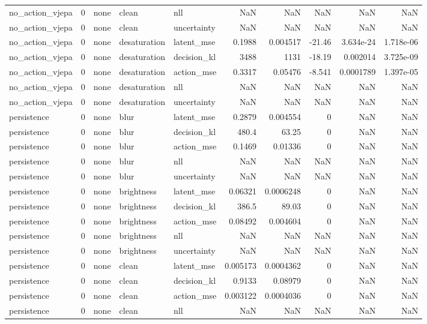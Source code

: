 \begin{tabular}{lrlllrrrrr}
no\_action\_vjepa & 0 & none & clean & nll & NaN & NaN & NaN & NaN & NaN \\
no\_action\_vjepa & 0 & none & clean & uncertainty & NaN & NaN & NaN & NaN & NaN \\
no\_action\_vjepa & 0 & none & desaturation & latent\_mse & 0.1988 & 0.004517 & -21.46 & 3.634e-24 & 1.718e-06 \\
no\_action\_vjepa & 0 & none & desaturation & decision\_kl & 3488 & 1131 & -18.19 & 0.002014 & 3.725e-09 \\
no\_action\_vjepa & 0 & none & desaturation & action\_mse & 0.3317 & 0.05476 & -8.541 & 0.0001789 & 1.397e-05 \\
no\_action\_vjepa & 0 & none & desaturation & nll & NaN & NaN & NaN & NaN & NaN \\
no\_action\_vjepa & 0 & none & desaturation & uncertainty & NaN & NaN & NaN & NaN & NaN \\
persistence & 0 & none & blur & latent\_mse & 0.2879 & 0.004554 & 0 & NaN & NaN \\
persistence & 0 & none & blur & decision\_kl & 480.4 & 63.25 & 0 & NaN & NaN \\
persistence & 0 & none & blur & action\_mse & 0.1469 & 0.01336 & 0 & NaN & NaN \\
persistence & 0 & none & blur & nll & NaN & NaN & NaN & NaN & NaN \\
persistence & 0 & none & blur & uncertainty & NaN & NaN & NaN & NaN & NaN \\
persistence & 0 & none & brightness & latent\_mse & 0.06321 & 0.0006248 & 0 & NaN & NaN \\
persistence & 0 & none & brightness & decision\_kl & 386.5 & 89.03 & 0 & NaN & NaN \\
persistence & 0 & none & brightness & action\_mse & 0.08492 & 0.004604 & 0 & NaN & NaN \\
persistence & 0 & none & brightness & nll & NaN & NaN & NaN & NaN & NaN \\
persistence & 0 & none & brightness & uncertainty & NaN & NaN & NaN & NaN & NaN \\
persistence & 0 & none & clean & latent\_mse & 0.005173 & 0.0004362 & 0 & NaN & NaN \\
persistence & 0 & none & clean & decision\_kl & 0.9133 & 0.08979 & 0 & NaN & NaN \\
persistence & 0 & none & clean & action\_mse & 0.003122 & 0.0004036 & 0 & NaN & NaN \\
persistence & 0 & none & clean & nll & NaN & NaN & NaN & NaN & NaN \\

\end{tabular}
